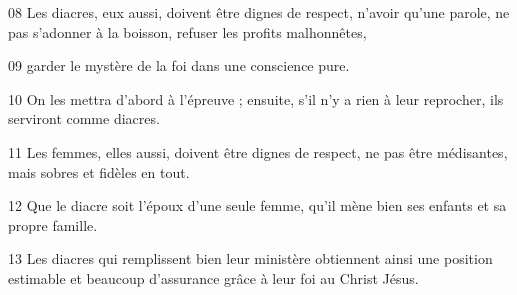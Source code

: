 
08 Les diacres, eux aussi, doivent être dignes de respect, n’avoir qu’une parole, ne pas s’adonner à la boisson, refuser les profits malhonnêtes,

09 garder le mystère de la foi dans une conscience pure.

10 On les mettra d’abord à l’épreuve ; ensuite, s’il n’y a rien à leur reprocher, ils serviront comme diacres.

11 Les femmes, elles aussi, doivent être dignes de respect, ne pas être médisantes, mais sobres et fidèles en tout.

12 Que le diacre soit l’époux d’une seule femme, qu’il mène bien ses enfants et sa propre famille.

13 Les diacres qui remplissent bien leur ministère obtiennent ainsi une position estimable et beaucoup d’assurance grâce à leur foi au Christ Jésus.
